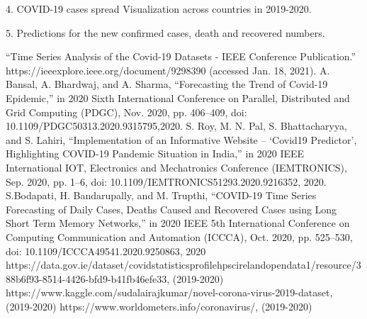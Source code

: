 \documentclass[12pt, a4paper]{article}
\begin{document}
	4. COVID-19 cases spread Visualization across countries in 2019-2020.
	
	5. Predictions for the new confirmed cases, death and recovered numbers.
	
	
	\begin{thebibliography}{9}
			“Time Series Analysis of the Covid-19 Datasets - IEEE Conference Publication.” https://ieeexplore.ieee.org/document/9298390 (accessed Jan. 18, 2021).
		A. Bansal, A. Bhardwaj, and A. Sharma, “Forecasting the Trend of Covid-19 Epidemic,” in 2020 Sixth International Conference on Parallel, Distributed and Grid Computing (PDGC), Nov. 2020, pp. 406–409, doi: 10.1109/PDGC50313.2020.9315795,2020.
			S. Roy, M. N. Pal, S. Bhattacharyya, and S. Lahiri, “Implementation of an Informative Website – ‘Covid19 Predictor’, Highlighting COVID-19 Pandemic Situation in India,” in 2020 IEEE International IOT, Electronics and Mechatronics Conference (IEMTRONICS), Sep. 2020, pp. 1–6, doi: 10.1109/IEMTRONICS51293.2020.9216352,  2020.
		S.Bodapati, H. Bandarupally, and M. Trupthi, “COVID-19 Time Series Forecasting of Daily Cases, Deaths Caused and Recovered Cases using Long Short Term Memory Networks,” in 2020 IEEE 5th International Conference on Computing Communication and Automation (ICCCA), Oct. 2020, pp. 525–530, doi: 10.1109/ICCCA49541.2020.9250863, 2020
		 https://data.gov.ie/dataset/covidstatisticsprofilehpscirelandopendata1/resource/388b6f93-8514-4426-bfd9-b41fb46efe33, (2019-2020)
		 https://www.kaggle.com/sudalairajkumar/novel-corona-virus-2019-dataset, (2019-2020)
		https://www.worldometers.info/coronavirus/, (2019-2020)
		
	\end{thebibliography}
	
\end{document}
